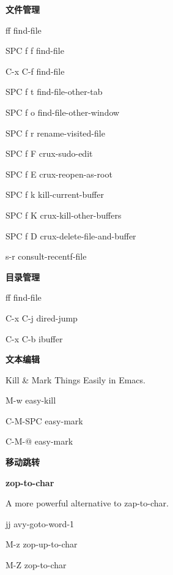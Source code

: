 \documentclass[10pt]{article}
\renewcommand\section[1]{\bigskip\par\textbf{\color{heading}\large#1}\smallskip}
\renewcommand\subsection[1]{\smallskip\par\textbf{\color{heading}#1}}
\newcommand\humanreadable[1]{{\par\color{default}\small\sffamily#1}}
\begin{document}
\begin{multicols}{4}
\begin{keylist}
  \end{keylist}

  \subsection{文件管理}
  \begin{keylist}
  \item[ff] find-file
  \item[SPC f f] find-file
  \item[C-x C-f] find-file
  \item[SPC f t] find-file-other-tab
  \item[SPC f o] find-file-other-window
  \item[SPC f r] rename-visited-file
  \item[SPC f F] crux-sudo-edit
  \item[SPC f E] crux-reopen-as-root
  \item[SPC f k] kill-current-buffer
  \item[SPC f K] crux-kill-other-buffers
  \item[SPC f D] crux-delete-file-and-buffer
  \item[s-r] consult-recentf-file

  \subsection{目录管理}
  \begin{keylist}
  \item[ff] find-file
  \item[C-x C-j] dired-jump
  \item[C-x C-b] ibuffer
  \end{keylist}

  \subsection{文本编辑}
  \humanreadable{Kill \& Mark Things Easily in Emacs.}
  \begin{keylist}
  \item[M-w] easy-kill
  \item[C-M-SPC] easy-mark
  \item[C-M-@] easy-mark
  \end{keylist}

  \section{移动跳转}
  \subsection{zop-to-char}
  \humanreadable{A more powerful alternative to zap-to-char.}
  \begin{keylist}
  \item[jj] avy-goto-word-1
  \item[M-z] zop-up-to-char
  \item[M-Z] zop-to-char
  \end{keylist}



\end{keylist}
\end{multicols}
\end{document}
